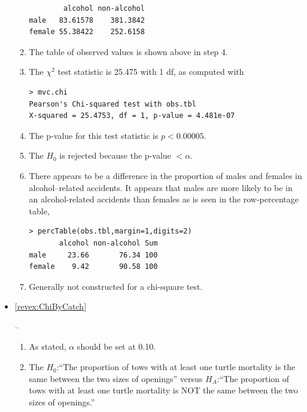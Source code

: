 \documentclass[10pt,openany]{book}\usepackage[]{graphicx}\usepackage[]{color}
\makeatletter
\newenvironment{kframe}{%
 \def\at@end@of@kframe{}%
 \ifinner\ifhmode%
  \def\at@end@of@kframe{\end{minipage}}%
  \begin{minipage}{\columnwidth}%
 \fi\fi%
 \def\FrameCommand##1{\hskip\@totalleftmargin \hskip-\fboxsep
 \colorbox{shadecolor}{##1}\hskip-\fboxsep
     \hskip-\linewidth \hskip-\@totalleftmargin \hskip\columnwidth}%
 \MakeFramed {\advance\hsize-\width
   \@totalleftmargin\z@ \linewidth\hsize
   \@setminipage}}%
 {\par\unskip\endMakeFramed%
 \at@end@of@kframe}
\newenvironment{knitrout}{}{} %
\makeatother
\begin{document}
\begin{itemize}
\begin{enumerate}
\begin{knitrout}
\begin{kframe}
\begin{verbatim}
        alcohol non-alcohol
male   83.61578    381.3842
female 55.38422    252.6158
\end{verbatim}
\end{kframe}
\end{knitrout}
      \item The table of observed values is shown above in step 4.
      \item The $\chi^{2}$ test statistic is 25.475 with 1 df, as computed with
\begin{knitrout}
\color{fgcolor}\begin{kframe}
\begin{verbatim}
> mvc.chi
Pearson's Chi-squared test with obs.tbl 
X-squared = 25.4753, df = 1, p-value = 4.481e-07
\end{verbatim}
\end{kframe}
\end{knitrout}
      \item The p-value for this test statistic is $p<0.00005$.
      \item The $H_{0}$ is rejected because the p-value $<\alpha$.
      \item There appears to be a difference in the proportion of males and females in alcohol--related accidents.  It appears that males are more likely to be in an alcohol-related accidents than females as is seen in the row-percentage table,
\begin{knitrout}
\color{fgcolor}\begin{kframe}
\begin{verbatim}
> percTable(obs.tbl,margin=1,digits=2)
       alcohol non-alcohol Sum
male     23.66       76.34 100
female    9.42       90.58 100
\end{verbatim}
\end{kframe}
\end{knitrout}
      \item Generally not constructed for a chi-square test.
    \end{enumerate}
  \item \hypertarget{ans:ChiByCatch}{\ref{revex:ChiByCatch}} --
    \begin{enumerate}
      \item As stated, $\alpha$ should be set at 0.10.
      \item The $H_{0}$:``The proportion of tows with at least one turtle mortality is the same between the two sizes of openings'' versus $H_{A}$:``The proportion of tows with at least one turtle mortality is NOT the same between the two sizes of openings.''

\end{enumerate}
\end{itemize}
\end{document}
